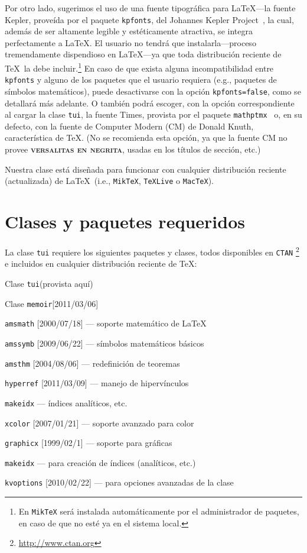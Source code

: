 \documentclass[11pt,
              article,
              oneside
              ]{memoir}
\newcommand*{\comando}[1]{\texttt{#1}}
\newcommand*{\paquete}[1]{\texttt{\color{NavyBlue}#1}\xspace}
\newcommand*{\tui}{{\normalfont\paquete{tui}}\xspace}
\newcommand*{\MEMOIR}{\paquete{memoir}}
\begin{document}
Por otro lado, sugerimos el uso de una fuente tipográfica para \LaTeX---la fuente Kepler, proveída por el paquete \paquete{kpfonts}, del Johannes Kepler Project~\cite{KPFONTS}, la cual, además de ser altamente legible y estéticamente atractiva, se integra perfectamente a \LaTeX. El usuario no tendrá que instalarla---proceso tremendamente dispendioso en \LaTeX---ya que toda distribución reciente de \TeX\ la debe incluir.\footnote{En \texttt{MikTeX} será instalada automáticamente por el administrador de paquetes, en caso de que no esté ya en el sistema local.} En caso de que exista alguna incompatibilidad entre \paquete{kpfonts} y alguno de los paquetes que el usuario requiera (e.g., paquetes de símbolos matemáticos), puede desactivarse con la opción \comando{kpfonts=false}, como se detallará más adelante. O también podrá escoger, con la opción correspondiente al cargar la clase \tui, la fuente Times, provista por el paquete \paquete{mathptmx}~\cite{TIMES} o, en su defecto, con la fuente de Computer Modern (CM) de Donald Knuth, característica de \TeX. (No se recomienda esta opción, ya que la fuente CM no provee \textsc{\bfseries versalitas en negrita}, usadas en los títulos de sección, etc.)

Nuestra clase está diseñada para funcionar con cualquier distribución reciente (actualizada) de \LaTeX\ (i.e., \paquete{MikTeX}, \paquete{TeXLive} o \paquete{MacTeX}).



\section{Clases y paquetes requeridos}
\noindent
La clase \tui requiere los siguientes paquetes y clases, todos disponibles en \paquete{CTAN}%
\footnote{\url{http://www.ctan.org}}
  e incluidos en cualquier distribución reciente de \TeX:
\medskip  
\begin{compactenum}
  \item Clase \tui (provista aquí)
  \item Clase \MEMOIR [2011/03/06]
  \item \paquete{amsmath} [2000/07/18] --- soporte matemático de \LaTeX
  \item \paquete{amssymb} [2009/06/22] --- símbolos matemáticos básicos
  \item \paquete{amsthm} [2004/08/06] --- redefinición de teoremas
  \item \paquete{hyperref} [2011/03/09] --- manejo de hipervínculos
  \item \paquete{makeidx} --- índices analíticos, etc.
  \item \paquete{xcolor} [2007/01/21] --- soporte avanzado para color
  \item \paquete{graphicx} [1999/02/1] --- soporte para gráficas
  \item \paquete{makeidx} --- para creación de índices (analíticos, etc.)
  \item \paquete{kvoptions} [2010/02/22] --- para opciones avanzadas de la clase
\end{compactenum}
\end{document}
